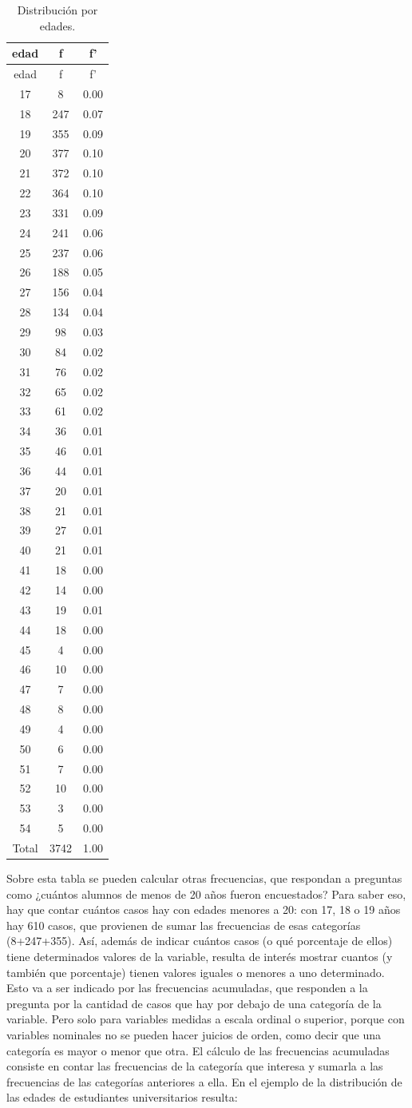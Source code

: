 \documentclass[]{book}
\begin{document}
\begin{longtable}[]{@{}ccc@{}}
\caption{\label{tab:unnamed-chunk-26}Distribución por edades.}\tabularnewline
\toprule
edad & f & f'\tabularnewline
\midrule
\endfirsthead
\toprule
edad & f & f'\tabularnewline
\midrule
\endhead
17 & 8 & 0.00\tabularnewline
18 & 247 & 0.07\tabularnewline
19 & 355 & 0.09\tabularnewline
20 & 377 & 0.10\tabularnewline
21 & 372 & 0.10\tabularnewline
22 & 364 & 0.10\tabularnewline
23 & 331 & 0.09\tabularnewline
24 & 241 & 0.06\tabularnewline
25 & 237 & 0.06\tabularnewline
26 & 188 & 0.05\tabularnewline
27 & 156 & 0.04\tabularnewline
28 & 134 & 0.04\tabularnewline
29 & 98 & 0.03\tabularnewline
30 & 84 & 0.02\tabularnewline
31 & 76 & 0.02\tabularnewline
32 & 65 & 0.02\tabularnewline
33 & 61 & 0.02\tabularnewline
34 & 36 & 0.01\tabularnewline
35 & 46 & 0.01\tabularnewline
36 & 44 & 0.01\tabularnewline
37 & 20 & 0.01\tabularnewline
38 & 21 & 0.01\tabularnewline
39 & 27 & 0.01\tabularnewline
40 & 21 & 0.01\tabularnewline
41 & 18 & 0.00\tabularnewline
42 & 14 & 0.00\tabularnewline
43 & 19 & 0.01\tabularnewline
44 & 18 & 0.00\tabularnewline
45 & 4 & 0.00\tabularnewline
46 & 10 & 0.00\tabularnewline
47 & 7 & 0.00\tabularnewline
48 & 8 & 0.00\tabularnewline
49 & 4 & 0.00\tabularnewline
50 & 6 & 0.00\tabularnewline
51 & 7 & 0.00\tabularnewline
52 & 10 & 0.00\tabularnewline
53 & 3 & 0.00\tabularnewline
54 & 5 & 0.00\tabularnewline
Total & 3742 & 1.00\tabularnewline
\bottomrule
\end{longtable}

Sobre esta tabla se pueden calcular otras frecuencias, que respondan a preguntas como ¿cuántos alumnos de menos de 20 años fueron encuestados? Para saber eso, hay que contar cuántos casos hay con edades menores a 20: con 17, 18 o 19 años hay 610 casos, que provienen de sumar las frecuencias de esas categorías (8+247+355).
Así, además de indicar cuántos casos (o qué porcentaje de ellos) tiene determinados valores de la variable, resulta de interés mostrar cuantos (y también que porcentaje) tienen valores iguales o menores a uno determinado. Esto va a ser indicado por las frecuencias acumuladas, que responden a la pregunta por la cantidad de casos que hay por debajo de una categoría de la variable. Pero solo para variables medidas a escala ordinal o superior, porque con variables nominales no se pueden hacer juicios de orden, como decir que una categoría es mayor o menor que otra. El cálculo de las frecuencias acumuladas consiste en contar las frecuencias de la categoría que interesa y sumarla a las frecuencias de las categorías anteriores a ella. En el ejemplo de la distribución de las edades de estudiantes universitarios resulta:
\end{document}
